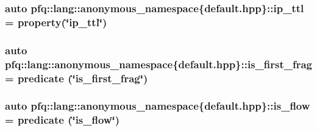 \hypertarget{namespacepfq_1_1lang_1_1anonymous__namespace_02default_8hpp_03_a885339d6e5b34ec5d037e085dfba9851}{
\subsubsection[{ip\+\_\+ttl}]{\setlength{\rightskip}{0pt plus 5cm}auto pfq\+::lang\+::anonymous\+\_\+namespace\{default.\+hpp\}\+::ip\+\_\+ttl = {\bf property}(\char`\"{}ip\+\_\+ttl\char`\"{})}}\label{namespacepfq_1_1lang_1_1anonymous__namespace_02default_8hpp_03_a885339d6e5b34ec5d037e085dfba9851}
\hypertarget{namespacepfq_1_1lang_1_1anonymous__namespace_02default_8hpp_03_afb797cc442d04e614a9ac68c7c4c35ff}{
\subsubsection[{is\+\_\+first\+\_\+frag}]{\setlength{\rightskip}{0pt plus 5cm}auto pfq\+::lang\+::anonymous\+\_\+namespace\{default.\+hpp\}\+::is\+\_\+first\+\_\+frag = {\bf predicate} (\char`\"{}is\+\_\+first\+\_\+frag\char`\"{})}}\label{namespacepfq_1_1lang_1_1anonymous__namespace_02default_8hpp_03_afb797cc442d04e614a9ac68c7c4c35ff}
\hypertarget{namespacepfq_1_1lang_1_1anonymous__namespace_02default_8hpp_03_ae52890434121a999589d48bccae3c3e2}{
\subsubsection[{is\+\_\+flow}]{\setlength{\rightskip}{0pt plus 5cm}auto pfq\+::lang\+::anonymous\+\_\+namespace\{default.\+hpp\}\+::is\+\_\+flow = {\bf predicate} (\char`\"{}is\+\_\+flow\char`\"{})}}\label{namespacepfq_1_1lang_1_1anonymous__namespace_02default_8hpp_03_ae52890434121a999589d48bccae3c3e2}
